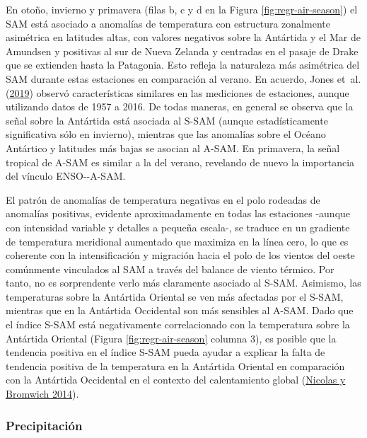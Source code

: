 \documentclass[12pt,oneside,a4paper]{reedthesis}
\begin{document}
En otoño, invierno y primavera (filas b, c y d en la Figura \ref{fig:regr-air-season}) el SAM está asociado a anomalías de temperatura con estructura zonalmente asimétrica en latitudes altas, con valores negativos sobre la Antártida y el Mar de Amundsen y positivas al sur de Nueva Zelanda y centradas en el pasaje de Drake que se extienden hasta la Patagonia.
Esto refleja la naturaleza más asimétrica del SAM durante estas estaciones en comparación al verano.
En acuerdo, Jones et~al. (\protect\hyperlink{ref-jones2019}{2019}) observó características similares en las mediciones de estaciones, aunque utilizando datos de 1957 a 2016.
De todas maneras, en general se observa que la señal sobre la Antártida está asociada al S-SAM (aunque estadísticamente significativa sólo en invierno), mientras que las anomalías sobre el Océano Antártico y latitudes más bajas se asocian al A-SAM.
En primavera, la señal tropical de A-SAM es similar a la del verano, revelando de nuevo la importancia del vínculo ENSO-\/-A-SAM.

El patrón de anomalías de temperatura negativas en el polo rodeadas de anomalías positivas, evidente aproximadamente en todas las estaciones -aunque con intensidad variable y detalles a pequeña escala-, se traduce en un gradiente de temperatura meridional aumentado que maximiza en la línea cero, lo que es coherente con la intensificación y migración hacia el polo de los vientos del oeste comúnmente vinculados al SAM a través del balance de viento térmico.
Por tanto, no es sorprendente verlo más claramente asociado al S-SAM.
Asimismo, las temperaturas sobre la Antártida Oriental se ven más afectadas por el S-SAM, mientras que en la Antártida Occidental son más sensibles al A-SAM.
Dado que el índice S-SAM está negativamente correlacionado con la temperatura sobre la Antártida Oriental (Figura \ref{fig:regr-air-season} columna 3), es posible que la tendencia positiva en el índice S-SAM pueda ayudar a explicar la falta de tendencia positiva de la temperatura en la Antártida Oriental en comparación con la Antártida Occidental en el contexto del calentamiento global (\protect\hyperlink{ref-nicolas2014}{Nicolas y Bromwich 2014}).

\hypertarget{precipitaciuxf3n}{%
\subsubsection{Precipitación}\label{precipitaciuxf3n}}
\end{document}

